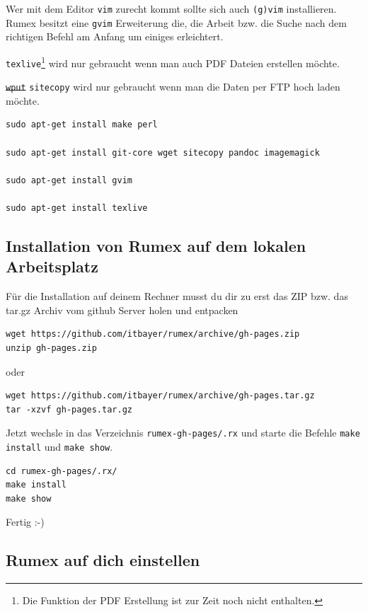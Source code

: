 \documentclass[%
fontsize=12pt,%
parskip=half,%
version=last%
]{scrreprt}
\begin{document}
Wer mit dem Editor \texttt{vim} zurecht kommt sollte sich auch
\texttt{(g)vim} installieren. Rumex besitzt eine \texttt{gvim}
Erweiterung die, die Arbeit bzw. die Suche nach dem richtigen Befehl am
Anfang um einiges erleichtert.

\texttt{texlive}\footnote{Die Funktion der PDF Erstellung ist zur Zeit
  noch nicht enthalten.} wird nur gebraucht wenn man auch PDF Dateien
erstellen möchte.

\sout{\texttt{wput}} \texttt{sitecopy} wird nur gebraucht wenn man die
Daten per FTP hoch laden möchte.

\begin{verbatim}
sudo apt-get install make perl

sudo apt-get install git-core wget sitecopy pandoc imagemagick

sudo apt-get install gvim

sudo apt-get install texlive
\end{verbatim}

\subsection{Installation von Rumex auf dem lokalen
Arbeitsplatz}\label{installation-von-rumex-auf-dem-lokalen-arbeitsplatz}

Für die Installation auf deinem Rechner musst du dir zu erst das ZIP
bzw. das tar.gz Archiv vom github Server holen und entpacken

\begin{verbatim}
wget https://github.com/itbayer/rumex/archive/gh-pages.zip
unzip gh-pages.zip
\end{verbatim}

oder

\begin{verbatim}
wget https://github.com/itbayer/rumex/archive/gh-pages.tar.gz
tar -xzvf gh-pages.tar.gz
\end{verbatim}

Jetzt wechsle in das Verzeichnis \texttt{rumex-gh-pages/.rx} und starte
die Befehle \texttt{make install} und \texttt{make show}.

\begin{verbatim}
cd rumex-gh-pages/.rx/
make install
make show
\end{verbatim}

Fertig :-)

\subsection{Rumex auf dich einstellen}\label{rumex-auf-dich-einstellen}
\end{document}
